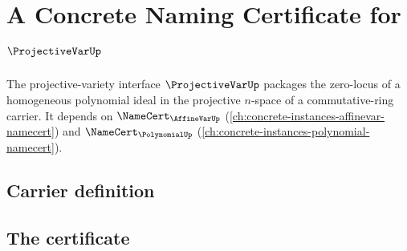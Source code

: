 \chapter{A Concrete Naming Certificate for $\ProjectiveVarUp$}
\label{ch:concrete-instances-projectivevar-namecert}

The projective-variety interface $\ProjectiveVarUp$ packages the zero-locus of a homogeneous polynomial ideal in the projective $n$-space of a commutative-ring carrier. It depends on $\NameCert_{\AffineVarUp}$ (\autoref{ch:concrete-instances-affinevar-namecert}) and $\NameCert_{\PolynomialUp}$ (\autoref{ch:concrete-instances-polynomial-namecert}).

\section{Carrier definition}
\label{sec:projectivevar-carrier}

\section{The certificate}
\label{sec:projectivevar-certificate}

